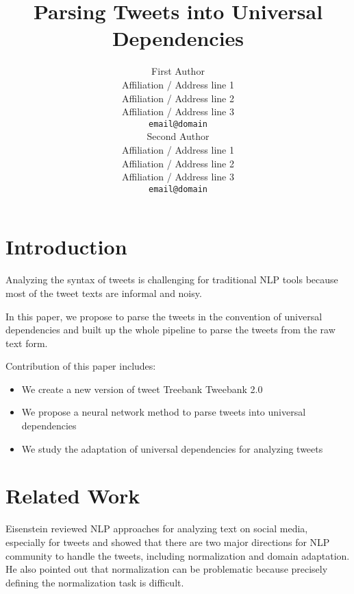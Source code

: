 \documentclass[11pt,letterpaper]{article}
\title{Parsing Tweets into Universal Dependencies}
\author{First Author \\
  Affiliation / Address line 1 \\
  Affiliation / Address line 2 \\
  Affiliation / Address line 3 \\
  {\tt email@domain} \\\And
  Second Author \\
  Affiliation / Address line 1 \\
  Affiliation / Address line 2 \\
  Affiliation / Address line 3 \\
  {\tt email@domain} \\}
\date{}
\begin{document}
\maketitle
\begin{abstract}

\end{abstract}




\section{Introduction}
Analyzing the syntax of tweets is challenging for traditional NLP tools because most of the tweet texts are informal and noisy.

In this paper, we propose to parse the tweets in the convention of universal dependencies and built up the whole pipeline to parse the tweets from the raw text form.

Contribution of this paper includes:
\begin{itemize}
\item We create a new version of tweet Treebank Tweebank 2.0
\item We propose a neural network method to parse tweets into universal dependencies
\item We study the adaptation of universal dependencies for analyzing tweets
\end{itemize}




\section{Related Work}
Eisenstein  reviewed NLP approaches for analyzing text on social media, especially for tweets and showed that there are two major directions for NLP community to handle the tweets, including normalization and domain adaptation. He also pointed out that normalization can be problematic because precisely defining the normalization task is difficult. 
\end{document}
